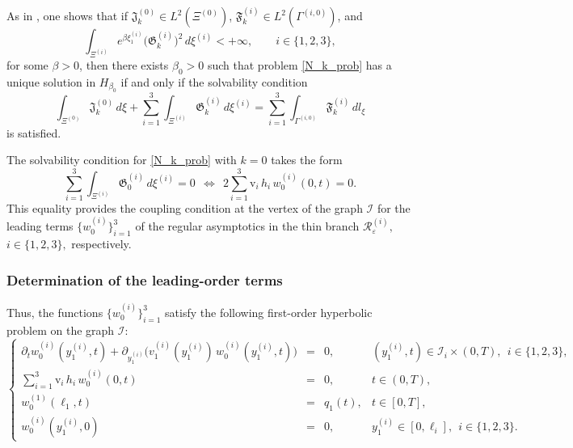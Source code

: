 \documentclass[reqno]{amsart}            %
\numberwithin{equation}{section}
\begin{document}
	As in \cite[Lemma 3.1]{Mel-Kle-2022}, one shows that if
	$\mathfrak{J}_k^{(0)}\in L^2(\Xi^{(0)})$, $\mathfrak{F}_k^{(i)}\in L^2(\Gamma^{(i,0)})$, and
	\[
	\int_{\Xi^{(i)}} e^{\beta\xi^{(i)}_1}\big(\mathfrak{G}^{(i)}_k\big)^2\,d\xi^{(i)}<+\infty,
	\qquad i\in\{1,2,3\},
	\]
	for some $\beta>0$, then there exists $\beta_0>0$ such that problem \eqref{N_k_prob}
	has a unique solution in $H_{\beta_0}$ if and only if the solvability condition
	\begin{equation}\label{solvability-cond}
		\int_{\Xi^{(0)}}\mathfrak{J}^{(0)}_k\,d\xi
		+ \sum_{i=1}^3\int_{\Xi^{(i)}}\mathfrak{G}^{(i)}_k\,d\xi^{(i)}
		= \sum_{i=1}^3\int_{\Gamma^{(i,0)}}\mathfrak{F}^{(i)}_k\,dl_\xi
	\end{equation}
	is satisfied.
	
	The solvability condition for \eqref{N_k_prob} with $k=0$ takes the form 
	\begin{equation}\label{solv-cond}
		\sum_{i=1}^{3}\int_{\Xi^{(i)}} \mathfrak{G}^{(i)}_0 \, d\xi^{(i)} = 0 \ \ \Longleftrightarrow \ \
		2 \sum_{i=1}^{3} \mathrm{v}_i  \, h_i \, w^{(i)}_0(0,t)   = 0.
	\end{equation}
	This equality provides the coupling condition at the vertex of the graph $\mathcal{I}$ for the leading terms $\{w^{(i)}_0\}_{i=1}^3$ of the regular asymptotics in the thin branch $\mathcal{R}^{(i)}_\varepsilon,$ $i\in\{1,2,3\},$ respectively. 
	
	\subsubsection{Determination of the leading-order terms} Thus, the functions $\{w^{(i)}_0\}_{i=1}^3$ satisfy  the following first-order hyperbolic problem on the graph $\mathcal{I}$:
	\begin{equation}\label{limit_prob}
		\left\{\begin{array}{rcll}
			\partial_t{w}^{(i)}_0(y_1^{(i)},t) + \partial_{y_1^{(i)}}\big( v_1^{(i)}(y_1^{(i)})\,  w^{(i)}_0(y_1^{(i)},t) \big) &=& 0,& (y_1^{(i)}, t) \in \mathcal{I}_i \times (0, T), \ \ i \in \{1,2,3\},
			\\[2pt]
			\sum_{i=1}^{3}  \mathrm{v}_i \, h_i\,  w_0^{(i)}(0, t) & = & 0,& t \in (0, T),
			\\[2mm]
			w_0^{(1)}(\ell_1,  t) & =  & q_1(t), & t \in [0, T], 
			\\[2mm]
			w_0^{(i)}(y_1^{(i)},  0) & = & 0, & y_1^{(i)} \in [0, \ell_i],  \ \ i \in \{1,2,3\}.
		\end{array}\right.
	\end{equation}
	
\end{document}
